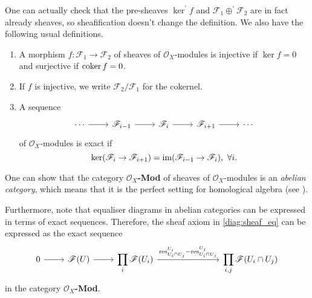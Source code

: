 One can actually check that the pre-sheaves $\ker^{\prime} f$ and
$\mathscr{F}_{1}\oplus^{\prime}\mathscr{F}_{2}$ are in fact already sheaves,
so sheafification doesn't change the definition. We also have the following
usual definitions.
\begin{defin}\hfill

  \begin{enumerate}
    \item A morphism $f:\mathscr{F}_{1}\to\mathscr{F}_{2}$ of sheaves of
          $\mathscr{O}_{X}$-modules is injective if $\ker f = 0$ and
          surjective if $\operatorname{coker} f = 0$.
    \item If $f$ is injective, we write $\mathscr{F}_{2}/\mathscr{F}_{1}$
          for the cokernel.
    \item A sequence
          \[\begin{tikzcd}
              \cdots\rar & \mathscr{F}_{i-1}\rar & \mathscr{F}_{i}\rar
              & \mathscr{F}_{i+1}\rar & \cdots
            \end{tikzcd}\]
          of $\mathscr{O}_{X}$-modules is exact if
          \[
          \ker(\mathscr{F}_{i}\to\mathscr{F}_{i+1})=\operatorname{im}(\mathscr{F}_{i-1}
          \to\mathscr{F}_{i}),\ \forall i.
          \]
  \end{enumerate}

\end{defin}
\begin{cat}
  One can show that the category $\mathscr{O}_{X}$\textbf{-Mod} of sheaves
  of $\mathscr{O}_{X}$-modules is an \emph{abelian category}, which means
  that it is the perfect setting for homological algebra (see \cite{vakil}).

  Furthermore, note that equaliser diagrams in abelian categories can be
  expressed in terms of exact sequences. Therefore, the sheaf axiom in
  \eqref{diag:sheaf_eq} can be expressed as the exact sequence
  \begin{equation}\label{diag:sheaf_ex}\begin{tikzcd}
      0\rar & \mathscr{F}(U)\rar & \displaystyle\prod_{i}\mathscr{F}(U_{i})
      \rar{\text{res}_{U_{i}\cap U_{j}}^{U_{i}}-\text{res}_{U_{i}\cap U_{j}}^{ U_{j}}}
      &[5em] \displaystyle\prod_{i,j}\mathscr{F}(U_{i}\cap U_{j})
    \end{tikzcd}\end{equation}
  in the category $\mathscr{O}_{X}$\textbf{-Mod}.
\end{cat}

